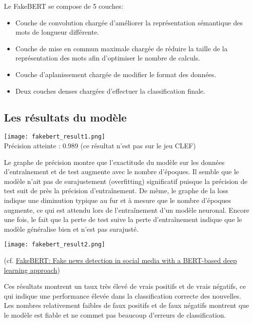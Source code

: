 \documentclass[11pt]{rapport_class}
\begin{document}
Le FakeBERT se compose de 5 couches:
\begin{itemize}
    \item Couche de convolution chargée d’améliorer la représentation sémantique des mots de longueur différente.
    \item Couche de mise en commun maximale chargée de réduire la taille de la représentation des mots afin d’optimiser le nombre de calculs.
    \item Couche d’aplanissement chargée de modifier le format des données.
    \item Deux couches denses chargées d’effectuer la classification finale.
\end{itemize}


\subsection{Les résultats du modèle}
\texttt{[image: fakebert\_result1.png]}\\
Précision atteinte : 0.989 (ce résultat n'est pas sur le jeu CLEF)

\qquad Le graphe de précision montre que l'exactitude du modèle sur les données d'entraînement et de test augmente avec le nombre d'époques. Il semble que le modèle n'ait pas de surajustement (overfitting) significatif puisque la précision de test suit de près la précision d'entraînement.
De même, le graphe de la loss indique une diminution typique au fur et à mesure que le nombre d'époques augmente, ce qui est attendu lors de l'entraînement d'un modèle neuronal. Encore une fois, le fait que la perte de test suive la perte d'entraînement indique que le modèle généralise bien et n'est pas surajusté.

\begin{center}
    \texttt{[image: fakebert\_result2.png]}\\
    \begin{tiny}
        (cf. \href{https://link.springer.com/article/10.1007/s11042-020-10183-2}{FakeBERT: Fake news detection in social media with a BERT-based deep learning approach})\\
    \end{tiny}
\end{center}

\qquad Ces résultats montrent un taux très élevé de vrais positifs et de vrais négatifs, ce qui indique une performance élevée dans la classification correcte des nouvelles. Les nombres relativement faibles de faux positifs et de faux négatifs montrent que le modèle est fiable et ne commet pas beaucoup d'erreurs de classification.
\end{document}
